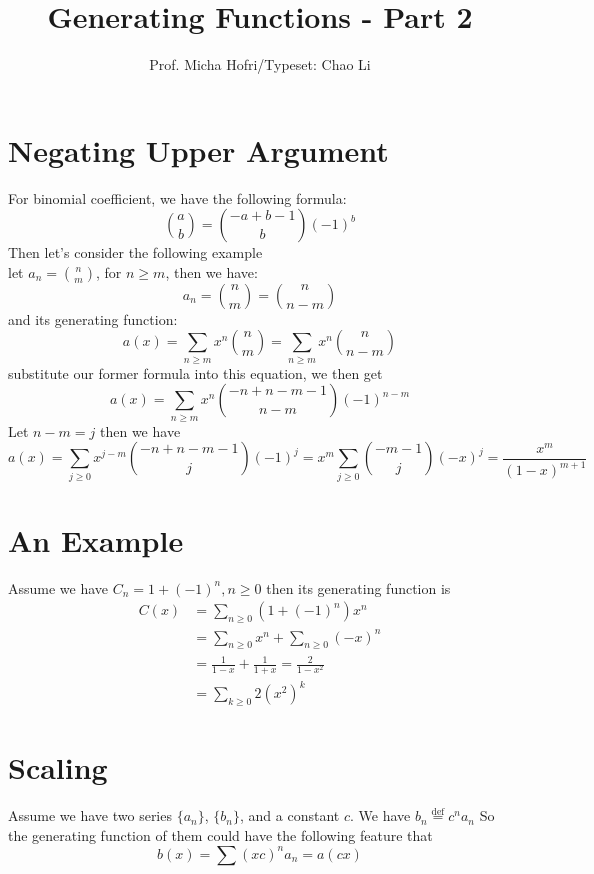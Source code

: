 \documentclass[11pt]{article}
\author{Prof. Micha Hofri/Typeset:  Chao Li}
\title{Generating Functions - Part 2}
\newcommand{\DS}{\displaystyle}
\begin{document}
\maketitle
\section*{Negating Upper Argument}
For binomial coefficient, we have the following formula:\\
\[
\binom{a}{b}=\binom{-a+b-1}{b}(-1)^b
\]
Then let's consider the following example\\
let \(\DS a_n=\binom{n}{m}\), for \(n\geq m\), then we have:\\
\[
a_n=\binom{n}{m}=\binom{n}{n-m}
\]
and its generating function:
\[
a(x)=\sum_{n\geq m}x^n\binom{n}{m}=\sum_{n\geq m}x^n\binom{n}{n-m}
\]
substitute our former formula into this equation, we then get
\[
a(x)=\sum_{n\geq m}x^n\binom{-n+n-m-1}{n-m}(-1)^{n-m}
\]
Let \(n-m=j\) then we have 
\[
a(x)=\sum_{j\geq 0}x^{j-m}\binom{-n+n-m-1}{j}(-1)^j=x^m\sum_{j\geq 0}\binom{-m-1}{j}(-x)^j=\frac{x^m}{(1-x)^{m+1}}
\]
\section*{An Example}
Assume we have \(\DS C_n=1+(-1)^n, n\geq 0\)
then its generating function is 
\begin{align*}
C(x) &= \sum_{n\geq 0}(1+(-1)^n)x^n \\
	 &= \sum_{n\geq 0}x^n+\sum_{n\geq 0}(-x)^n \\
	 &= \frac{1}{1-x}+\frac{1}{1+x}=\frac{2}{1-x^2} \\
	 &= \sum_{k\geq 0}2(x^2)^k
\end{align*}
\section*{Scaling}
Assume we have two series \(\{a_n\}\), \(\{b_n\}\), and a constant \(c\). We have \(\DS b_n\overset{\text{def}}{=}c^na_n\)
So the generating function of them could have the following feature that
\[
b(x)=\sum(xc)^na_n=a(cx)
\]
\end{document}
